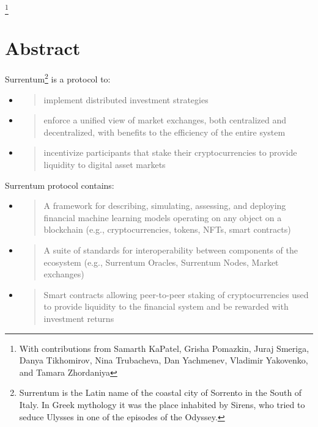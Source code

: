 \documentclass[11pt, reqno]{amsart}
\begin{document}
\author{Giacinto Paolo Saggese}
\author{Paul Smith}

\thanks{With contributions from
	Samarth KaPatel,
	Grisha Pomazkin,
	Juraj Smeriga,
	Danya Tikhomirov,
	Nina Trubacheva,
	Dan Yachmenev,
	Vladimir Yakovenko,
	and
	Tamara Zhordaniya}

\date{\today}

\maketitle

\section{Abstract}

Surrentum\footnote{Surrentum is the Latin name of the coastal city of
  Sorrento in the South of Italy. In Greek mythology it was the place
  inhabited by Sirens, who tried to seduce Ulysses in one of the
  episodes of the Odyssey.} is a protocol to:

\begin{itemize}
\item
  \begin{quote}
  implement distributed investment strategies
  \end{quote}
\item
  \begin{quote}
  enforce a unified view of market exchanges, both centralized and
  decentralized, with benefits to the efficiency of the entire system
  \end{quote}
\item
  \begin{quote}
  incentivize participants that stake their cryptocurrencies to provide
  liquidity to digital asset markets
  \end{quote}
\end{itemize}

Surrentum protocol contains:

\begin{itemize}
\item
  \begin{quote}
  A framework for describing, simulating, assessing, and deploying
  financial machine learning models operating on any object on a
  blockchain (e.g., cryptocurrencies, tokens, NFTs, smart contracts)
  \end{quote}
\item
  \begin{quote}
  A suite of standards for interoperability between components of the
  ecosystem (e.g., Surrentum Oracles, Surrentum Nodes, Market exchanges)
  \end{quote}
\item
  \begin{quote}
  Smart contracts allowing peer-to-peer staking of cryptocurrencies used
  to provide liquidity to the financial system and be rewarded with
  investment returns
  \end{quote}
\end{itemize}
\end{document}
